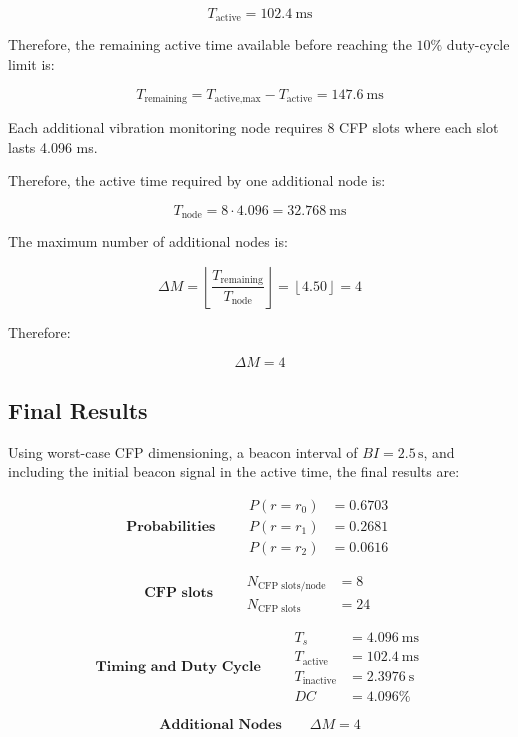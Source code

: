 \documentclass[a4paper,12pt]{article}
\begin{document}
\[
T_{\text{active}} = 102.4 \ \text{ms}
\]

Therefore, the remaining active time available before reaching the \(10\%\) duty-cycle limit is:

\[
T_{\text{remaining}} = T_{\text{active,max}} - T_{\text{active}}= 147.6 \ \text{ms}
\]

Each additional vibration monitoring node requires 8 CFP slots where each slot lasts 4.096 ms.


Therefore, the active time required by one additional node is:

\[
T_{\text{node}} = 8 \cdot 4.096= 32.768 \ \text{ms}
\]


The maximum number of additional nodes is:

\[
\Delta M =
\left\lfloor
\frac{T_{\text{remaining}}}{T_{\text{node}}}
\right\rfloor
=
\left\lfloor
4.50
\right\rfloor
=4
\]


Therefore:

\[
\boxed{\Delta M = 4}
\]

\subsection{Final Results}

Using worst-case CFP dimensioning, a beacon interval of \(BI=2.5\,\text{s}\), and including the initial beacon signal in the active time, the final results are:

\[
\textbf{Probabilities}
\qquad
\boxed{
\begin{aligned}
P(r=r_0) &= 0.6703 \\
P(r=r_1) &= 0.2681 \\
P(r=r_2) &= 0.0616
\end{aligned}
}
\]

\[
\textbf{CFP slots}
\qquad
\boxed{
\begin{aligned}
N_{\text{CFP slots/node}} &= 8 \\
N_{\text{CFP slots}} &= 24
\end{aligned}
}
\]

\[
\textbf{Timing and Duty Cycle}
\qquad
\boxed{
\begin{aligned}
T_s &= 4.096 \ \text{ms} \\
T_{\text{active}} &= 102.4 \ \text{ms} \\
T_{\text{inactive}} &= 2.3976 \ \text{s} \\
DC &= 4.096\%
\end{aligned}
}
\]

\[
\textbf{Additional Nodes}
\qquad
\boxed{
\Delta M = 4
}
\]
\end{document}
